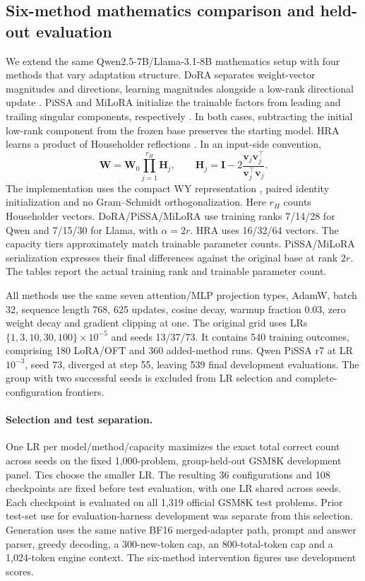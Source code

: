 \subsection{Six-method mathematics comparison and held-out evaluation}\label{app:math-six}\label{app:language}
We extend the same Qwen2.5-7B/Llama-3.1-8B mathematics setup with four methods that vary adaptation structure. DoRA separates weight-vector magnitudes and directions, learning magnitudes alongside a low-rank directional update \citep{liu2024dora}. PiSSA and MiLoRA initialize the trainable factors from leading and trailing singular components, respectively \citep{meng2024pissa,wang2025milora}. In both cases, subtracting the initial low-rank component from the frozen base preserves the starting model. HRA learns a product of Householder reflections \citep{yuan2024hra}. In an input-side convention,
\begin{equation*}
 \bm W=\bm W_0\prod_{j=1}^{r_H}\bm H_j,
 \qquad \bm H_j=\bm I-2\frac{\bm v_j\bm v_j^{\!\top}}{\bm v_j^{\!\top}\bm v_j}.
\end{equation*}
The implementation uses the compact WY representation \citep{schreiber1989wy,likhosherstov2021cwy}, paired identity initialization and no Gram--Schmidt orthogonalization. Here $r_H$ counts Householder vectors. DoRA/PiSSA/MiLoRA use training ranks 7/14/28 for Qwen and 7/15/30 for Llama, with $\alpha=2r$. HRA uses 16/32/64 vectors. The capacity tiers approximately match trainable parameter counts. PiSSA/MiLoRA serialization expresses their final differences against the original base at rank $2r$. The tables report the actual training rank and trainable parameter count.

All methods use the same seven attention/MLP projection types, AdamW, batch 32, sequence length 768, 625 updates, cosine decay, warmup fraction 0.03, zero weight decay and gradient clipping at one. The original grid uses LRs $\{1,3,10,30,100\}\times10^{-5}$ and seeds 13/37/73. It contains 540 training outcomes, comprising 180 LoRA/OFT and 360 added-method runs. Qwen PiSSA r7 at LR $10^{-3}$, seed 73, diverged at step 55, leaving 539 final development evaluations. The group with two successful seeds is excluded from LR selection and complete-configuration frontiers.

\paragraph{Selection and test separation.}
One LR per model/method/capacity maximizes the exact total correct count across seeds on the fixed 1,000-problem, group-held-out GSM8K development panel. Ties choose the smaller LR. The resulting 36 configurations and 108 checkpoints are fixed before test evaluation, with one LR shared across seeds. Each checkpoint is evaluated on all 1,319 official GSM8K test problems. Prior test-set use for evaluation-harness development was separate from this selection. Generation uses the same native BF16 merged-adapter path, prompt and answer parser, greedy decoding, a 300-new-token cap, an 800-total-token cap and a 1,024-token engine context. The six-method intervention figures use development scores.

